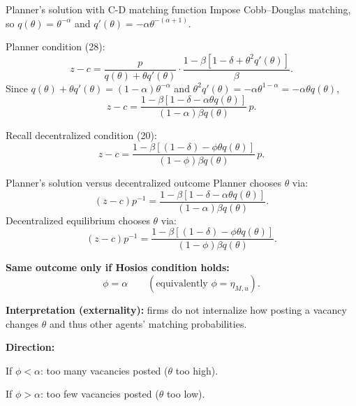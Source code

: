 \documentclass[aspectratio=169,xcolor=dvipsnames]{beamer}
\let\tempone\itemize
\let\temptwo\enditemize
\renewenvironment{itemize}{\tempone\addtolength{\itemsep}{\fill}}{\temptwo}
\begin{document}
\begin{frame}{Planner's solution with C-D matching function}
\label{slide:MP_50_PlannerCD}
\small
Impose Cobb--Douglas matching, so \(q(\theta)=\theta^{-\alpha}\) and \(q'(\theta)=-\alpha\theta^{-(\alpha+1)}\).

Planner condition (28):
\[
z-c
=
\frac{p}{q(\theta)+\theta q'(\theta)}
\cdot\frac{1-\beta[1-\delta+\theta^2 q'(\theta)]}{\beta}.
\]
Since \(q(\theta)+\theta q'(\theta)=(1-\alpha)\theta^{-\alpha}\) and \(\theta^2 q'(\theta)=-\alpha\theta^{1-\alpha}=-\alpha\theta q(\theta)\),
\[
z-c
=
\frac{1-\beta[1-\delta-\alpha\theta q(\theta)]}{(1-\alpha)\beta q(\theta)}\,p.
\tag{29}
\]

Recall decentralized condition (20):
\[
z-c
=
\frac{1-\beta[(1-\delta)-\phi\theta q(\theta)]}{(1-\phi)\beta q(\theta)}\,p.
\tag{20}
\]
\end{frame}

\begin{frame}{Planner's solution versus decentralized outcome}
\label{slide:MP_51_PlannerVsDec}
\small
Planner chooses \(\theta\) via:
\[
(z-c)p^{-1}=\frac{1-\beta[1-\delta-\alpha\theta q(\theta)]}{(1-\alpha)\beta q(\theta)}.
\]
Decentralized equilibrium chooses \(\theta\) via:
\[
(z-c)p^{-1}=\frac{1-\beta[(1-\delta)-\phi\theta q(\theta)]}{(1-\phi)\beta q(\theta)}.
\]

\medskip
\textbf{Same outcome only if Hosios condition holds:}
\[
\phi=\alpha\qquad (\text{equivalently } \phi=\eta_{M,u}).
\]

\medskip
\textbf{Interpretation (externality):}
firms do not internalize how posting a vacancy changes \(\theta\) and thus other agents' matching probabilities.

\medskip
\textbf{Direction:}
\begin{itemize}
    \item If \(\phi<\alpha\): too many vacancies posted (\(\theta\) too high).
    \item If \(\phi>\alpha\): too few vacancies posted (\(\theta\) too low).
\end{itemize}
\end{frame}
\end{document}
